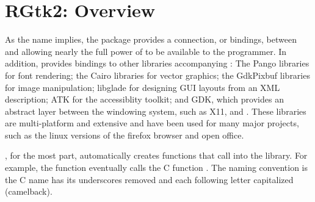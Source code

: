 




\chapter{RGtk2: Overview}
\label{sec:RGtk2-Introduction}


As the name implies, the  package provides a connection, or
bindings, between \GTK\/ and \R\/ allowing nearly the full power of
\GTK\/ to be available to the \R\/ programmer. In addition,
 provides bindings to other libraries accompanying \GTK:
The Pango libraries for font rendering; the Cairo
libraries for vector graphics; the GdkPixbuf libraries for image
manipulation; libglade for designing GUI layouts from an XML
description; ATK for the accessiblity toolkit;  and GDK, which
provides an abstract layer between the windowing system, such as X11,
and \GTK. These libraries are multi-platform and extensive and have been
used for many major projects, such as the linux versions of the
firefox browser and open office.



, for the most part, automatically creates \R\/ functions
that call into the \GTK\/ library. For example, the \R\/ function
 eventually calls the C function
. The naming convention is the C name has its underscores
removed and each following letter capitalized (camelback).


